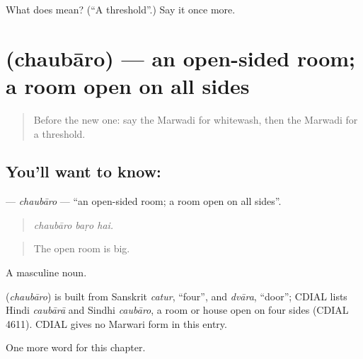 \begin{tcolorbox}[breakable,colback=teal!4,colframe=teal!35!black,title={Before you move on}]
What does  mean? (\textquotedblleft{}A threshold\textquotedblright{}.) Say it once more.
\end{tcolorbox}
\section[\texorpdfstring{\mw{चौबारो} (chaubāro)}{चौबारो (chaubāro)}]{ (chaubāro) — an open-sided room; a room open on all sides}

\label{lesson:MW-C189-chaubaro}



\begin{quote}
Before the new one: say the Marwadi for whitewash, then the Marwadi for a threshold.
\end{quote}

\subsection*{You'll want to know: }
\textbf{} — \emph{chaubāro} — \textquotedblleft{}an open-sided room; a room open on all sides\textquotedblright{}.

\begin{quote}
  
\end{quote}

\begin{quote}
\emph{chaubāro baṛo hai.}
\end{quote}

\begin{quote}
The open room is big.
\end{quote}

A masculine noun.

\begin{cousinweb}
\textbf{} (\emph{chaubāro}) is built from Sanskrit \emph{catur}, \textquotedblleft{}four\textquotedblright{}, and \emph{dvāra}, \textquotedblleft{}door\textquotedblright{}; CDIAL lists Hindi \emph{caubārā} and Sindhi \emph{caubāro}, a room or house open on four sides (CDIAL 4611). CDIAL gives no Marwari form in this entry.
\end{cousinweb}

\begin{grammarlens}[title={What you've built}]
One more word for this chapter.
\end{grammarlens}

